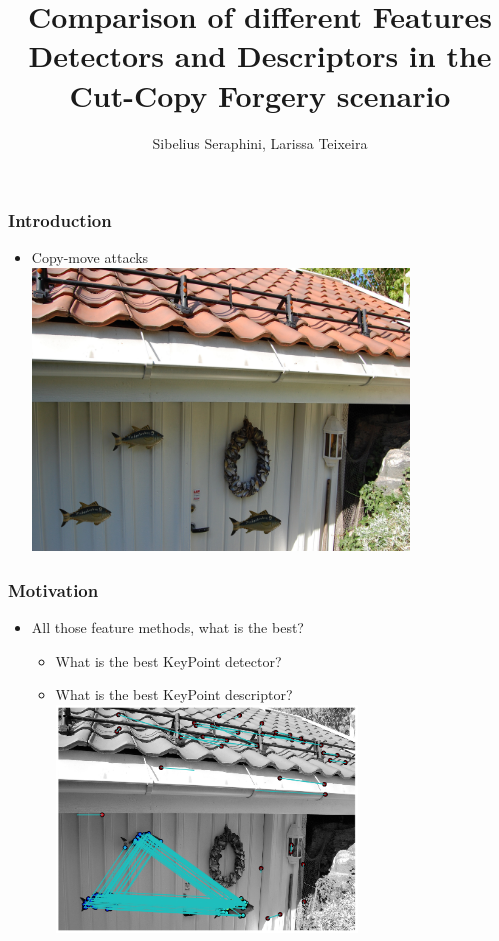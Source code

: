\documentclass{beamer}
\title[Features]{Comparison of different Features Detectors and Descriptors in the Cut-Copy Forgery scenario}
\institute[CSI 445]{
    CSI 445 - Digital Image Forensics
}
\author[Seraphini,Teixeira]{Sibelius Seraphini, Larissa Teixeira}
\date{}
\begin{document}
    \frame{\titlepage}

    \begin{frame}
        \frametitle{Introduction}
        \begin{itemize}[<+->]
            \item Copy-move attacks
            \includegraphics[width=10cm]{tamp}
        \end{itemize}
    \end{frame}

    \begin{frame}
        \frametitle{Motivation}
        \begin{itemize}
            \item All those feature methods, what is the best?
            	\begin{itemize}
                    \item What is the best KeyPoint detector?
                    \item What is the best KeyPoint descriptor?
                    \includegraphics[width=8cm]{detected}
                \end{itemize}
        \end{itemize}
    \end{frame}
\end{document}
